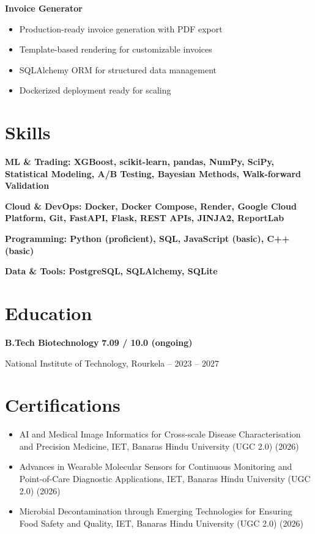 \documentclass[11pt,a4paper]{article}
\begin{document}
\noindent\textbf{Invoice Generator} \hfill \href{https://github.com/jiyanshusingh/invoice-generator}{\faGithub}
\begin{itemize}
    \item Production-ready invoice generation with PDF export
    \item Template-based rendering for customizable invoices
    \item SQLAlchemy ORM for structured data management
    \item Dockerized deployment ready for scaling
\end{itemize}

\section*{Skills}
\noindent\textbf{ML \& Trading: XGBoost, scikit-learn, pandas, NumPy, SciPy, Statistical Modeling, A/B Testing, Bayesian Methods, Walk-forward Validation}

\noindent\textbf{Cloud \& DevOps: Docker, Docker Compose, Render, Google Cloud Platform, Git, FastAPI, Flask, REST APIs, JINJA2, ReportLab}

\noindent\textbf{Programming: Python (proficient), SQL, JavaScript (basic), C++ (basic)}

\noindent\textbf{Data \& Tools: PostgreSQL, SQLAlchemy, SQLite}

\section*{Education}
\noindent\textbf{B.Tech Biotechnology} \hfill \textbf{7.09 / 10.0 (ongoing)}

\noindent National Institute of Technology, Rourkela -- 2023 – 2027

\section*{Certifications}
\begin{itemize}
    \item AI and Medical Image Informatics for Cross-scale Disease Characterisation and Precision Medicine, IET, Banaras Hindu University (UGC 2.0) (2026)
    \item Advances in Wearable Molecular Sensors for Continuous Monitoring and Point-of-Care Diagnostic Applications, IET, Banaras Hindu University (UGC 2.0) (2026)
    \item Microbial Decontamination through Emerging Technologies for Ensuring Food Safety and Quality, IET, Banaras Hindu University (UGC 2.0) (2026)
\end{itemize}
\end{document}
